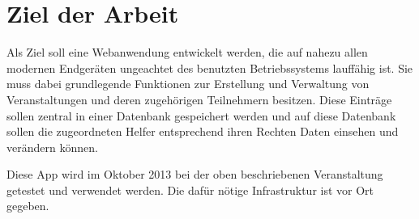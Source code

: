 \section{Ziel der Arbeit}
Als Ziel soll eine Webanwendung entwickelt werden, die auf nahezu allen modernen Endgeräten ungeachtet des benutzten Betriebssystems lauffähig ist. Sie muss dabei grundlegende Funktionen zur Erstellung und Verwaltung von Veranstaltungen und deren zugehörigen Teilnehmern besitzen. Diese Einträge sollen zentral in einer Datenbank gespeichert werden und auf diese Datenbank sollen die zugeordneten Helfer entsprechend ihren Rechten Daten einsehen und verändern können.\par
Diese App wird im Oktober 2013 bei der oben beschriebenen Veranstaltung getestet und verwendet werden. Die dafür nötige Infrastruktur ist vor Ort gegeben.